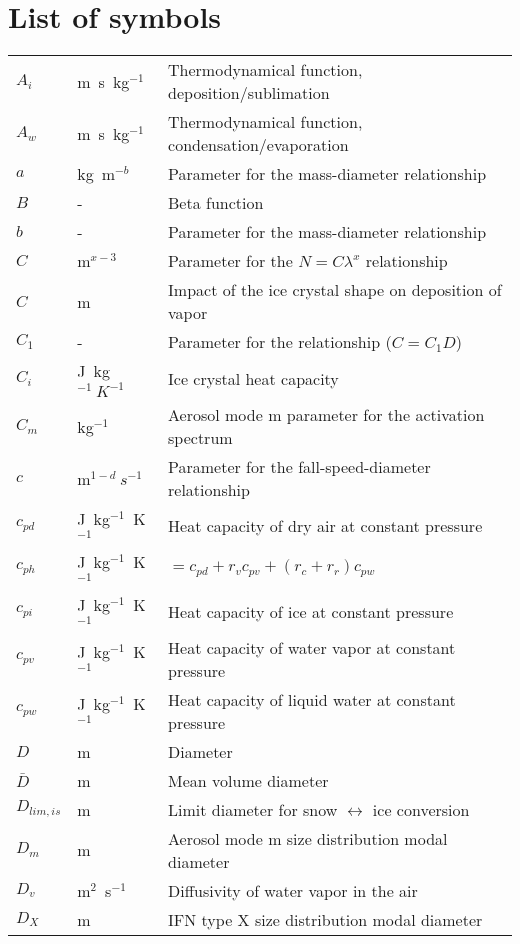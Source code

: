 \section{List of symbols}
\setlongtables
\begin{longtable}{lll}
$A_i$ & m~s~kg$^{-1}$ & Thermodynamical function, deposition/sublimation \\
$A_w$ & m~s~kg$^{-1}$ & Thermodynamical function, condensation/evaporation \\
$a$ & kg~m$^{-b}$ & Parameter for the mass-diameter relationship \\
$B$ & - & Beta function \\
$b$ & - & Parameter for the mass-diameter relationship \\
$C$ & m$^{x-3}$ & Parameter for the $N=C \lambda^x$ relationship \\
$C$ & m & Impact of the ice crystal shape on deposition of vapor \\
$C_{1}$ & - & Parameter for the relationship ($C=C_{1}D$)\\
$C_i$ & J~kg$^{-1}~K^{-1}$ & Ice crystal heat capacity \\
$C_m$ & kg$^{-1}$ & Aerosol mode m parameter for the activation spectrum \\
$c$ & m$^{1-d}~s^{-1}$ & Parameter for the fall-speed-diameter relationship \\
$c_{pd}$ & J~kg$^{-1}$~K$^{-1}$ & Heat capacity of dry air at constant pressure \\
$c_{ph}$ & J~kg$^{-1}$~K$^{-1}$ & $=c_{pd} + r_v c_{pv} + (r_c + r_r) c_{pw} $ \\
$c_{pi}$ & J~kg$^{-1}$~K$^{-1}$ & Heat capacity of ice at constant pressure \\
$c_{pv}$ & J~kg$^{-1}$~K$^{-1}$ & Heat capacity of water vapor at constant pressure \\
$c_{pw}$ & J~kg$^{-1}$~K$^{-1}$ & Heat capacity of liquid water at constant pressure \\
$D$ & m & Diameter \\
$\bar{D}$ & m & Mean volume diameter \\
$D_{lim,is}$ & m & Limit diameter for snow $\leftrightarrow$ ice conversion \\
$D_m$ & m & Aerosol mode m size distribution modal diameter \\
$D_v$ & m$^2$~s$^{-1}$ & Diffusivity of water vapor in the air \\
$D_X$ & m & IFN type X size distribution modal diameter \\

\end{longtable}
